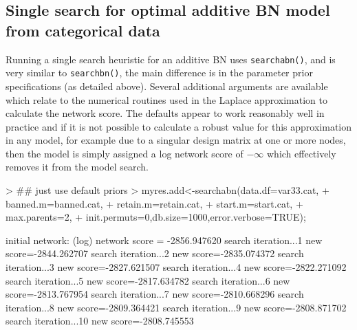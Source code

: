 \documentclass[nojss]{jss}
\begin{document}
\subsection{Single search for optimal additive BN model from categorical data}
Running a single search heuristic for an additive BN uses {\tt searchabn()}, and is very similar to {\tt searchbn()}, the main difference is in the parameter prior specifications (as detailed above). Several additional arguments are available which relate to the numerical routines used in the Laplace approximation to calculate the network score. The defaults appear to work reasonably well in practice and if it is not possible to calculate a robust value for this approximation in any model, for example due to a singular design matrix at one or more nodes, then the model is simply assigned a log network score of $-\infty$ which effectively removes it from the model search.  

\begin{Schunk}
\begin{Sinput}
> ## just use default priors 
> myres.add<-searchabn(data.df=var33.cat,
+                  banned.m=banned.cat,
+                  retain.m=retain.cat,
+                  start.m=start.cat,
+                  max.parents=2, 
+                  init.permuts=0,db.size=1000,error.verbose=TRUE);
\end{Sinput}
\begin{Soutput}
initial network: (log) network score = -2856.947620
search iteration...1 new score=-2844.262707
search iteration...2 new score=-2835.074372
search iteration...3 new score=-2827.621507
search iteration...4 new score=-2822.271092
search iteration...5 new score=-2817.634782
search iteration...6 new score=-2813.767954
search iteration...7 new score=-2810.668296
search iteration...8 new score=-2809.364421
search iteration...9 new score=-2808.871702
search iteration...10 new score=-2808.745553
\end{Soutput}
\end{Schunk}
\end{document}
